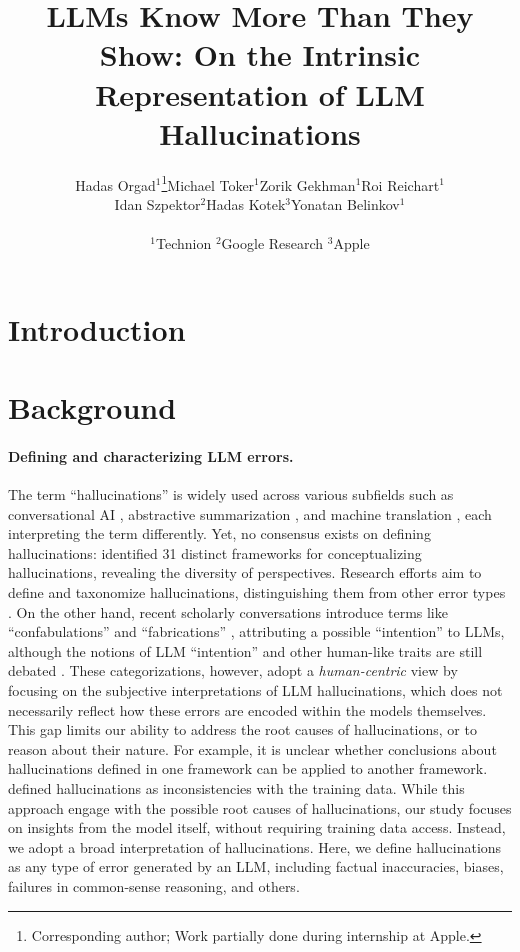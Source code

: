 \documentclass{article} %
\title{LLMs Know More Than They Show: On the Intrinsic Representation of LLM Hallucinations}
\author{
\begin{tabular}{@{}l}
Hadas Orgad$^1$\thanks{Corresponding author; Work partially done during internship at Apple.}\quad Michael Toker$^1$\quad Zorik Gekhman$^1$\quad Roi Reichart$^1$ \\
Idan Szpektor$^2$\quad Hadas Kotek$^3$\quad Yonatan Belinkov$^1$\mystrut \\
\end{tabular}\\
$^1$Technion\mystrut\quad
$^2$Google Research\mystrut\quad
$^3$Apple\\
}
\begin{document}
\maketitle

\begin{abstract}



\end{abstract}

\section{Introduction}



\section{Background}

\paragraph{Defining and characterizing LLM errors.}

The term ``hallucinations'' is widely used across various subfields such as conversational AI \citep{liu-etal-2022-token}, abstractive summarization \citep{zhang-etal-2019-ernie}, and machine translation \citep{wang-sennrich-2020-exposure}, each interpreting the term differently.
Yet, no consensus exists on defining hallucinations: \citet{venkit2024confidently} identified 31 distinct frameworks for conceptualizing hallucinations, revealing the diversity of perspectives.
Research efforts aim to define and taxonomize hallucinations, distinguishing them from other error types \citep{liu-etal-2022-token, ji2023survey, huang2023survey, rawte2023troubling}.
On the other hand, recent scholarly conversations introduce terms like ``confabulations'' \citep{millidge2023llms} and ``fabrications'' \citep{mcgowan2023chatgpt}, attributing a possible ``intention'' to LLMs, although the notions of LLM ``intention'' and other human-like traits are still debated \citep{salles2020anthropomorphism, serapio2023personality, harnad2024language}.
These categorizations, however, adopt a \textit{human-centric} view by focusing on the subjective interpretations of LLM hallucinations, which does not necessarily reflect how these errors are encoded within the models themselves.
This gap limits our ability to address the root causes of hallucinations, or to reason about their nature.
For example, it is unclear whether conclusions about hallucinations defined in one framework can be applied to another framework.
\citet{liang2024internal} defined hallucinations as inconsistencies with the training data.
While this approach engage with the possible root causes of hallucinations, our study focuses on insights from the model itself, without requiring training data access.
Instead, we adopt a broad interpretation of hallucinations. Here, we define hallucinations as any type of error generated by an LLM, including factual inaccuracies, biases, failures in common-sense reasoning, and others. 
\end{document}
